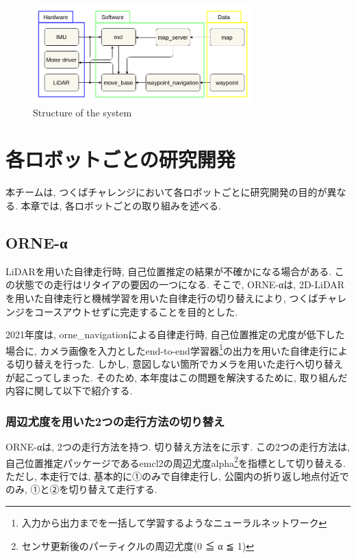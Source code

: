 \documentclass[uplatex, twocolumn, 9pt]{jsproceedings}
\begin{document}
\begin{figure}[h]
  \centering
  \includegraphics[width=85mm]{fig/software.pdf}
  \caption{Structure of the system}
  \label{fig:soft-fig}%
\end{figure}

\newpage
\section{各ロボットごとの研究開発}
本チームは, つくばチャレンジにおいて各ロボットごとに研究開発の目的が異なる. 本章では, 各ロボットごとの取り組みを述べる.

\subsection{ORNE-α}
LiDARを用いた自律走行時, 自己位置推定の結果が不確かになる場合がある. この状態での走行はリタイアの要因の一つになる. そこで, ORNE-αは, 2D-LiDARを用いた自律走行と機械学習を用いた自律走行の切り替えにより, つくばチャレンジをコースアウトせずに完走することを目的とした. \par 2021年度は, orne\_navigationによる自律走行時, 自己位置推定の尤度が低下した場合に, カメラ画像を入力としたend-to-end学習器\footnote[1]{入力から出力までを一括して学習するようなニューラルネットワーク}\cite{end-to-end}の出力を用いた自律走行による切り替えを行った. しかし, 意図しない箇所でカメラを用いた走行へ切り替えが起こってしまった. そのため, 本年度はこの問題を解決するために, 取り組んだ内容に関して以下で紹介する. 

\subsubsection{周辺尤度を用いた2つの走行方法の切り替え}
ORNE-αは, 2つの走行方法を持つ. 切り替え方法をに示す. この2つの走行方法は, 自己位置推定パッケージであるemcl2\cite{emcl2-git}の周辺尤度alpha\footnote[2]{センサ更新後のパーティクルの周辺尤度(0 ≦ α ≦ 1)}を指標として切り替える. ただし, 本走行では, 基本的に①のみで自律走行し, 公園内の折り返し地点付近でのみ, ①と②を切り替えて走行する.
\end{document}
